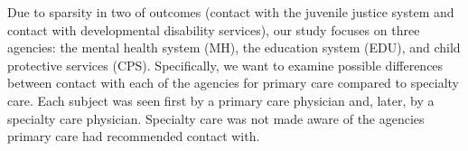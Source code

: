 \documentclass{article}
\begin{document}
	Due to sparsity in two of outcomes (contact with the juvenile justice system and contact with developmental disability services), our study focuses on three agencies: the mental health system (MH), the education system (EDU), and child protective services (CPS). Specifically, we want to examine possible differences between contact with each of the agencies for primary care compared to specialty care. Each subject was seen first by a primary care physician and, later, by a specialty care physician. Specialty care was not made aware of the agencies primary care had recommended contact with. 
	
		
\end{document}
